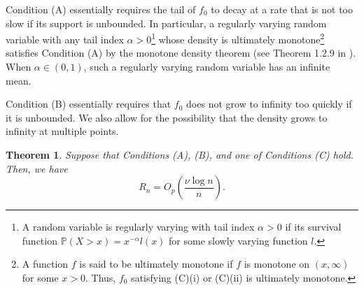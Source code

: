 \documentclass[12pt,letterpaper, twoside, openany]{article}
\theoremstyle{plain}
\newtheorem{theorem}{Theorem}[section]
\begin{document}
Condition (A) essentially requires the tail of $f_0$ to decay at a rate that is not too slow if its support is unbounded. In particular, a regularly varying random variable with any tail index $\alpha > 0$\footnote{A random variable is regularly varying with tail index $\alpha >0$ if its survival function $\mathbb{P}(X > x) = x^{-\alpha}l(x)$ for some slowly varying function $l$.} whose density is ultimately monotone\footnote{A function $f$ is said to be ultimately monotone if $f$ is monotone on $(x, \infty)$ for some $x > 0$. Thus, $f_0$ satisfying (C)(i) or (C)(ii) is ultimately monotone.} satisfies Condition (A) by the monotone density theorem (see Theorem 1.2.9 in \cite{mikosch1999regular}). When $\alpha \in (0, 1)$, such a regularly varying random variable has an infinite mean. 

Condition (B) essentially requires that $f_0$ does not grow to infinity too quickly if it is unbounded. We also allow for the possibility that the density grows to infinity at multiple points. 

\begin{theorem}\label{theorem:Rn_order}
Suppose that Conditions (A), (B), and one of Conditions (C) hold. 
Then, we have
\begin{equation*}
	R_n = O_p\left( \frac{\nu \log n}{n}\right).
\end{equation*}
\end{theorem}
 
\end{document}
